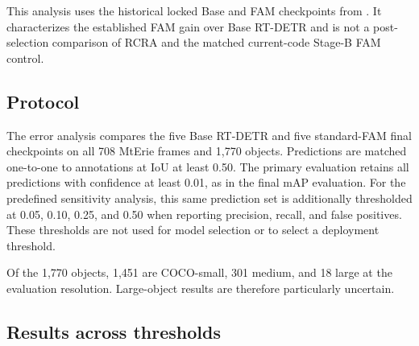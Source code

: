 This analysis uses the historical locked Base and FAM checkpoints from
. It characterizes the established FAM gain over
Base RT-DETR and is not a post-selection comparison of RCRA and the matched
current-code Stage-B FAM control.

\subsection{Protocol}

The error analysis compares the five Base RT-DETR and five standard-FAM final
checkpoints on all 708 MtErie frames and 1,770 objects. Predictions are matched
one-to-one to annotations at IoU at least 0.50. The primary evaluation retains
all predictions with confidence at least 0.01, as in the final mAP evaluation.
For the predefined sensitivity analysis, this same prediction set is
additionally thresholded at 0.05, 0.10, 0.25, and 0.50 when reporting
precision, recall, and false positives. These thresholds are not used for model
selection or to select a deployment threshold.

Of the 1,770 objects, 1,451 are COCO-small, 301 medium, and 18 large at the
evaluation resolution. Large-object results are therefore particularly
uncertain.

\subsection{Results across thresholds}

